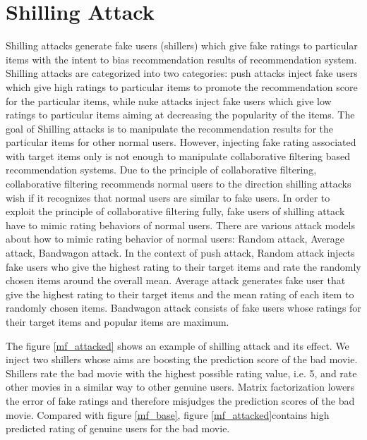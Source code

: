 \documentclass[master,english,final]{kaist-ucs}
\begin{document}
\section{Shilling Attack}

Shilling attacks generate fake users (shillers) which give fake ratings to particular items with the intent to bias recommendation results of recommendation system.
Shilling attacks are categorized into two categories: push attacks inject fake users which give high ratings to particular items to promote the recommendation score for the particular items, while nuke attacks inject fake users which give low ratings to particular items aiming at decreasing the popularity of the items.
The goal of Shilling attacks is to manipulate the recommendation results for the particular items for other normal users.
However, injecting fake rating associated with target items only is not enough to manipulate collaborative filtering based recommendation systems.
Due to the principle of collaborative filtering, collaborative filtering recommends normal users to the direction shilling attacks wish if it recognizes that normal users are similar to fake users.
In order to exploit the principle of collaborative filtering fully, fake users of shilling attack have to mimic rating behaviors of normal users.
There are various attack models about how to mimic rating behavior of normal users: Random attack, Average attack, Bandwagon attack.
In the context of push attack, Random attack injects fake users who give the highest rating to their target items and rate the randomly chosen items around the overall mean.
Average attack generates fake user that give the highest rating to their target items and the mean rating of each item to randomly chosen items.
Bandwagon attack consists of fake users whose ratings for their target items and popular items are maximum.

The figure \ref{mf_attacked} shows an example of shilling attack and its effect. We inject two shillers whose aims are boosting the prediction score of the bad movie.
Shillers rate the bad movie with the highest possible rating value, i.e. 5, and rate other movies in a similar way to other genuine users.
Matrix factorization lowers the error of fake ratings and therefore misjudges the prediction scores of the bad movie.
Compared with figure \ref{mf_base}, figure \ref{mf_attacked}contains high predicted rating of genuine users for the bad movie.
\end{document}
